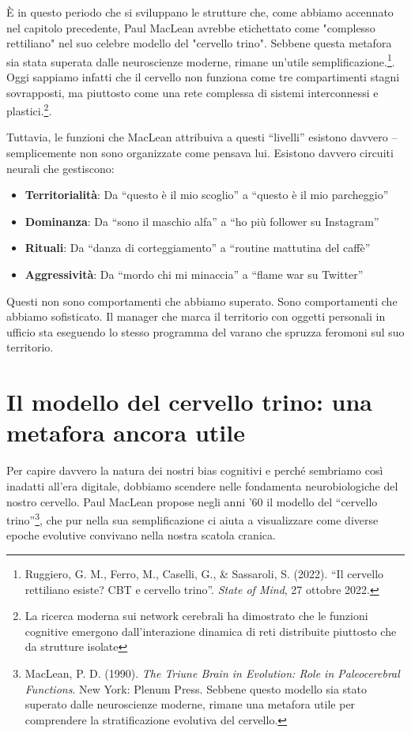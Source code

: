 È in questo periodo che si sviluppano le strutture che, come abbiamo accennato nel capitolo precedente, Paul MacLean avrebbe etichettato come "complesso rettiliano" nel suo celebre modello del "cervello trino". Sebbene questa metafora sia stata superata dalle neuroscienze moderne, rimane un'utile semplificazione.\footnote{Ruggiero, G. M., Ferro, M., Caselli, G., \& Sassaroli, S. (2022). ``Il cervello rettiliano esiste? CBT e cervello trino''. \textit{State of Mind}, 27 ottobre 2022.}. Oggi sappiamo infatti che il cervello non funziona come tre compartimenti stagni sovrapposti, ma piuttosto come una rete complessa di sistemi interconnessi e plastici.\footnote{La ricerca moderna sui network cerebrali ha dimostrato che le funzioni cognitive emergono dall'interazione dinamica di reti distribuite piuttosto che da strutture isolate}.

Tuttavia, le funzioni che MacLean attribuiva a questi ``livelli'' esistono davvero – semplicemente non sono organizzate come pensava lui. Esistono davvero circuiti neurali che gestiscono:

\begin{itemize}
\item \textbf{Territorialità}: Da ``questo è il mio scoglio'' a ``questo è il mio parcheggio''
\item \textbf{Dominanza}: Da ``sono il maschio alfa'' a ``ho più follower su Instagram''
\item \textbf{Rituali}: Da ``danza di corteggiamento'' a ``routine mattutina del caffè''
\item \textbf{Aggressività}: Da ``mordo chi mi minaccia'' a ``flame war su Twitter''
\end{itemize}

Questi non sono comportamenti che abbiamo superato. Sono comportamenti che abbiamo sofisticato. Il manager che marca il territorio con oggetti personali in ufficio sta eseguendo lo stesso programma del varano che spruzza feromoni sul suo territorio.

\section{Il modello del cervello trino: una metafora ancora utile}

Per capire davvero la natura dei nostri bias cognitivi e perché sembriamo così inadatti all'era digitale, dobbiamo scendere nelle fondamenta neurobiologiche del nostro cervello. Paul MacLean propose negli anni '60 il modello del ``cervello trino''\footnote{MacLean, P. D. (1990). \textit{The Triune Brain in Evolution: Role in Paleocerebral Functions}. New York: Plenum Press. Sebbene questo modello sia stato superato dalle neuroscienze moderne, rimane una metafora utile per comprendere la stratificazione evolutiva del cervello.}, che pur nella sua semplificazione ci aiuta a visualizzare come diverse epoche evolutive convivano nella nostra scatola cranica.

